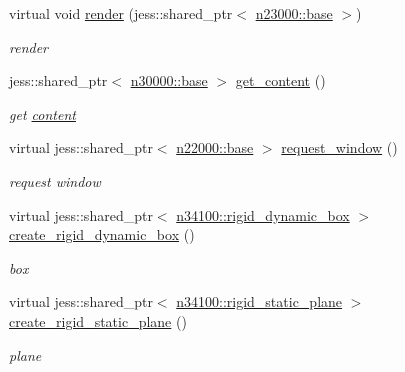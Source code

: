 \begin{DoxyCompactItemize}
virtual void \hyperlink{classnebula_1_1content_1_1scene_1_1admin_1_1base_a2277d2ac0673a1b74d93b10271717645}{render} (jess::shared\_\-ptr$<$ \hyperlink{classnebula_1_1platform_1_1renderer_1_1base}{n23000::base} $>$)
\begin{DoxyCompactList}\small\item\em render \item\end{DoxyCompactList}\item 
jess::shared\_\-ptr$<$ \hyperlink{classnebula_1_1content_1_1base}{n30000::base} $>$ \hyperlink{classnebula_1_1content_1_1scene_1_1admin_1_1base_a72f9c3efe12cd38144f8b4739924c114}{get\_\-content} ()
\begin{DoxyCompactList}\small\item\em get \hyperlink{namespacenebula_1_1content}{content} \item\end{DoxyCompactList}\item 
virtual jess::shared\_\-ptr$<$ \hyperlink{classnebula_1_1platform_1_1window_1_1base}{n22000::base} $>$ \hyperlink{classnebula_1_1content_1_1scene_1_1admin_1_1base_acc441d15af4759faa85966795fe53df8}{request\_\-window} ()
\begin{DoxyCompactList}\small\item\em request window \item\end{DoxyCompactList}\item 
virtual jess::shared\_\-ptr$<$ \hyperlink{classnebula_1_1content_1_1actor_1_1admin_1_1rigid__dynamic__box}{n34100::rigid\_\-dynamic\_\-box} $>$ \hyperlink{classnebula_1_1content_1_1scene_1_1admin_1_1base_ad48ed9a2603206a825343fad50d16e62}{create\_\-rigid\_\-dynamic\_\-box} ()
\begin{DoxyCompactList}\small\item\em box \item\end{DoxyCompactList}\item 
virtual jess::shared\_\-ptr$<$ \hyperlink{classnebula_1_1content_1_1actor_1_1admin_1_1rigid__static__plane}{n34100::rigid\_\-static\_\-plane} $>$ \hyperlink{classnebula_1_1content_1_1scene_1_1admin_1_1base_a628327c71fbffd119a3b7dadf188edd6}{create\_\-rigid\_\-static\_\-plane} ()
\begin{DoxyCompactList}\small\item\em plane \item\end{DoxyCompactList}\item 

\end{DoxyCompactItemize}
